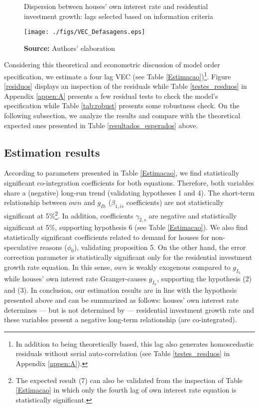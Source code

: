 \begin{figure}
	\centering
	\caption{Dispersion between houses' own interest rate and residential investment growth: lags selected based on information criteria}
	\label{defasagens}
	\texttt{[image: ./figs/VEC\_Defasagens.eps]}
	\caption*{\textbf{Source:} Authors' elaboration}
\end{figure}


Considering this theoretical and econometric discussion of model order specification, we estimate a four lag VEC  (see Table \ref{Estimacao})\footnote{
	In addition to being theoretically based, this lag also generates homoscedastic residuals without serial auto-correlation (see Table \ref{testes_resduos} in Appendix \ref{appen:A}).
}. 
Figure \ref{residuos} displays an inspection of the residuals while Table \ref{testes_resduos} in Appendix \ref{appen:A} presents a few residual tests to check the model's specification while Table \ref{tab:robust} presents some robustness check.
On the following subsection, we analyze the results and compare with the theoretical expected ones presented in Table \ref{resultados_esperados} above.  



\subsection{Estimation results}\label{sec:results}

According to parameters presented in Table \ref{Estimacao}, we find statistically significant co-integration  coefficients for both equations. 
Therefore, both variables share a (negative) long-run trend (validating hypotheses 1 and 4).
The short-term relationship between $own$ and $g_{Ih}$ ($\beta_{1, is}$ coefficients) are not statistically significant at 5\%\footnote{
	The expected result (7) can also be validated from the inspection of Table \ref{Estimacao} in which only the fourth lag of own interest rate equation is statistically significant.
}.
In addition, coefficients $\gamma_{2,s}$ are negative and statistically significant at 5\%, supporting hypothesis 6 (see Table  \ref{Estimacao}). 
We also find statistically significant coefficients related to demand for houses for non-speculative reasons ($\phi_0$), validating proposition 5.
On the other hand, the error correction parameter is statistically significant only for the residential investment growth rate equation.
In this sense, $own$ is weakly exogenous compared to $g_{I_h}$ while houses' own interest rate Granger-causes $g_{I_h}$, supporting the hypothesis (2) and (3).
In conclusion, our estimation results are in line with the hypothesis presented above and can be summarized as follows: houses' own interest rate determines --- but is not determined by --- residential investment growth rate and these variables present a negative long-term relationship (are co-integrated).


